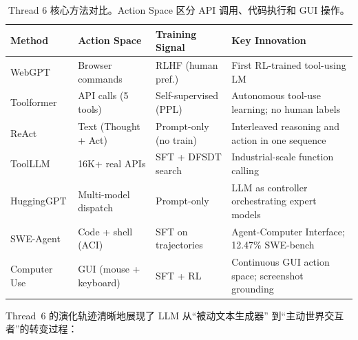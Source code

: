 \begin{table}[!ht]
\centering
\caption{Thread 6 核心方法对比。Action Space 区分 API 调用、代码执行和 GUI 操作。}
\label{tab:agentic-comparison}
\small
\begin{tabularx}{\textwidth}{l >{\raggedright\arraybackslash}p{2.2cm} >{\raggedright\arraybackslash}p{2.2cm} >{\raggedright\arraybackslash}X}
\toprule
\textbf{Method} & \textbf{Action Space} & \textbf{Training Signal} & \textbf{Key Innovation} \\
\midrule
WebGPT & Browser commands & RLHF (human pref.) & First RL-trained tool-using LM \\
Toolformer & API calls (5 tools) & Self-supervised (PPL) & Autonomous tool-use learning; no human labels \\
ReAct & Text (Thought + Act) & Prompt-only (no train) & Interleaved reasoning and action in one sequence \\
ToolLLM & 16K+ real APIs & SFT + DFSDT search & Industrial-scale function calling \\
HuggingGPT & Multi-model dispatch & Prompt-only & LLM as controller orchestrating expert models \\
SWE-Agent & Code + shell (ACI) & SFT on trajectories & Agent-Computer Interface; 12.47\% SWE-bench \\
Computer Use & GUI (mouse + keyboard) & SFT + RL & Continuous GUI action space; screenshot grounding \\
\bottomrule
\end{tabularx}
\end{table}

Thread~6 的演化轨迹清晰地展现了 LLM 从``被动文本生成器''
到``主动世界交互者''的转变过程：

